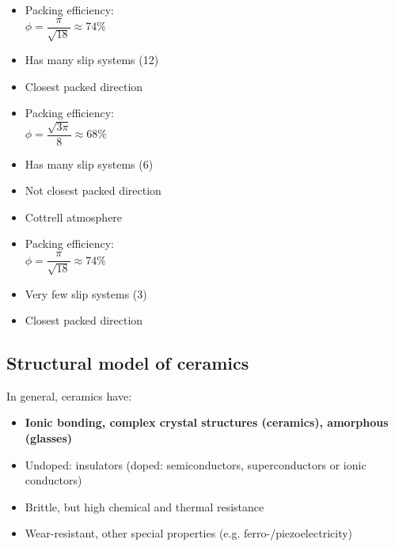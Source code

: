 \documentclass{article}
\begin{document}
\begin{minipage}[t]{0.33\textwidth}
  \begin{itemize}
    \item Packing efficiency:\\[0.1cm]
      $\phi = \dfrac{\pi}{\sqrt{18}} \approx 74\%$
    \item Has many slip systems (12)
    \item Closest packed direction
  \end{itemize}
\end{minipage}%
\begin{minipage}[t]{0.33\textwidth}
  \begin{itemize}
    \item Packing efficiency:\\[0.1cm]
      $\phi = \dfrac{\sqrt{3\pi}}{8} \approx 68\%$
    \item Has many slip systems (6)
    \item Not closest packed direction
    \item Cottrell atmosphere
  \end{itemize}
\end{minipage}%
\begin{minipage}[t]{0.33\textwidth}
  \vspace*{-0.45cm}
  \begin{itemize}
    \item Packing efficiency:\\[0.1cm]
      $\phi = \dfrac{\pi}{\sqrt{18}} \approx 74\%$
    \item Very few slip systems (3)
    \item Closest packed direction
  \end{itemize}
\end{minipage}

\newpage

\subsection{Structural model of ceramics}
In general, ceramics have:
\begin{itemize}
  \item \textbf{Ionic bonding, complex crystal structures (ceramics), amorphous (glasses)}
  \item Undoped: insulators (doped: semiconductors, superconductors or ionic conductors)
  \item Brittle, but high chemical and thermal resistance
  \item Wear-resistant, other special properties (e.g. ferro-/piezoelectricity)
\end{itemize}
\end{document}
